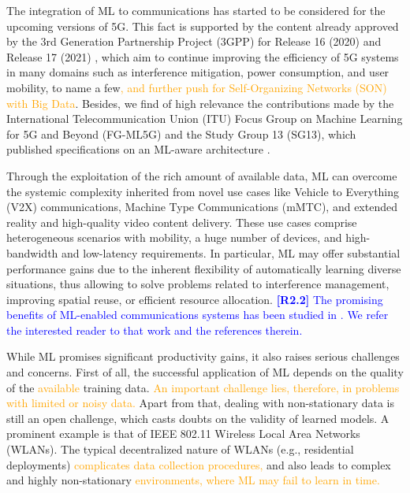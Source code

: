 \documentclass[journal]{IEEEtran}
\begin{document}
	The integration of ML to communications has started to be considered for the upcoming versions of 5G. This fact is supported by the content already approved by the 3rd Generation Partnership Project (3GPP) for Release 16 (2020) and Release 17 (2021) \cite{3gpp2019study}, which aim to continue improving the efficiency of 5G systems in many domains such as interference mitigation, power consumption, and user mobility, to name a few\textcolor{orange}{, and further push for Self-Organizing Networks (SON) with Big Data}. Besides, we find of high relevance the contributions made by the International Telecommunication Union (ITU) Focus Group on Machine Learning for 5G and Beyond (FG-ML5G) and the Study Group 13 (SG13), which published specifications on an ML-aware architecture \cite{ITU3172, ITU3174}.
	
	Through the exploitation of the rich amount of available data, ML can overcome the systemic complexity inherited from novel use cases like Vehicle to Everything (V2X) communications, Machine Type Communications (mMTC), and extended reality and high-quality video content delivery. These use cases comprise heterogeneous scenarios with mobility, a huge number of devices, and high-bandwidth and low-latency requirements. In particular, ML may offer substantial performance gains due to the inherent flexibility of automatically learning diverse situations, thus allowing to solve problems related to interference management, improving spatial reuse, or efficient resource allocation. \textcolor{blue}{\textbf{[R2.2]} The promising benefits of ML-enabled communications systems has been studied in \cite{itu_architecture}. We refer the interested reader to that work and the references therein.}
	
	While ML promises significant productivity gains, it also raises serious challenges and concerns. First of all, the successful application of ML depends on the quality of the \textcolor{orange}{available} training data. \textcolor{orange}{An important challenge lies, therefore, in problems with limited or noisy data.} Apart from that, dealing with non-stationary data is still an open challenge, which casts doubts on the validity of learned models. A prominent example is that of IEEE 802.11 Wireless Local Area Networks (WLANs). The typical decentralized nature of WLANs (e.g., residential deployments) \textcolor{orange}{complicates data collection procedures, }and also leads to complex and highly non-stationary \textcolor{orange}{environments, where ML may fail to learn in time.}
	
\end{document}
